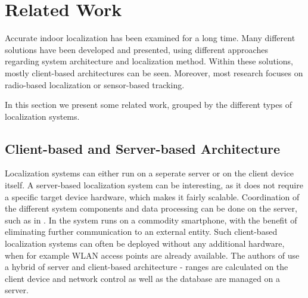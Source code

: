 
\chapter{Related Work} %

\label{Chapter2} %
Accurate indoor localization has been examined for a long time. Many different solutions have been developed and presented, using different approaches regarding system architecture and localization method. Within these solutions, mostly client-based architectures can be seen. Moreover, most research focuses on radio-based localization or sensor-based tracking.

In this section we present some related work, grouped by the different types of localization systems.




\section{Client-based and Server-based Architecture}
Localization systems can either run on a seperate server or on the client device itself. A server-based localization system can be interesting, as it does not require a specific target device hardware, which makes it fairly scalable. Coordination of the different system components and data processing can be done on the server, such as in \cite{Delmastro}.
In \cite{Carrera} the system runs on a commodity smartphone, with the benefit of eliminating further communication to an external entity. Such client-based localization systems can often be deployed without any additional hardware, when for example WLAN access points are already available. The authors of \cite{Guoguo} use a hybrid of server and client-based architecture - ranges are calculated on the client device and network control as well as the database are managed on a server. 

